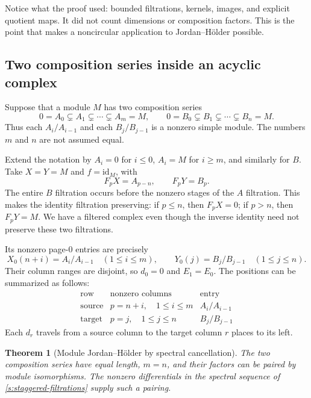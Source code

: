 \documentclass[11pt]{article}
\newtheorem{theorem}{Theorem}[section]
\theoremstyle{definition}
\theoremstyle{remark}\newtheorem{remark}[theorem]{Remark}
\newcommand{\id}{\mathrm{id}}
\begin{document}
Notice what the proof used: bounded filtrations, kernels, images, and
explicit quotient maps. It did not count dimensions or composition
factors. This is the point that makes a noncircular application to
Jordan--H\"older possible.

\subsection{Two composition series inside an acyclic complex}

Suppose that a module $M$ has two composition series
\[
0=A_0\subsetneq A_1\subsetneq\cdots\subsetneq A_m=M,
\qquad
0=B_0\subsetneq B_1\subsetneq\cdots\subsetneq B_n=M.
\]
Thus each $A_i/A_{i-1}$ and each $B_j/B_{j-1}$ is a nonzero simple
module. The numbers $m$ and $n$ are not assumed equal.

Extend the notation by $A_i=0$ for $i\leq0$, $A_i=M$ for $i\geq m$,
and similarly for $B$. Take $X=Y=M$ and $f=\id_M$, with
\begin{equation}\label{s:staggered-filtrations}
F_pX=A_{p-n},\qquad F_pY=B_p.
\end{equation}
The entire $B$ filtration occurs before the nonzero stages of the
$A$ filtration. This makes the identity filtration preserving:
if $p\leq n$, then $F_pX=0$; if $p>n$, then $F_pY=M$.
We have a filtered complex even though the inverse identity need not
preserve these two filtrations.

Its nonzero page-$0$ entries are precisely
\[
X_0(n+i)=A_i/A_{i-1}\quad(1\leq i\leq m),
\qquad
Y_0(j)=B_j/B_{j-1}\quad(1\leq j\leq n).
\]
Their column ranges are disjoint, so $d_0=0$ and $E_1=E_0$.
The positions can be summarized as follows:
\[
\begin{array}{c|c|c}
\text{row}&\text{nonzero columns}&\text{entry}\\ \hline
\text{source}&p=n+i,\quad1\leq i\leq m&A_i/A_{i-1}\\
\text{target}&p=j,\quad1\leq j\leq n&B_j/B_{j-1}
\end{array}
\]
Each $d_r$ travels from a source column to the target column $r$ places
to its left.

\begin{theorem}[Module Jordan--H\"older by spectral cancellation]
\label{s:jordan-holder}
The two composition series have equal length, $m=n$, and their factors
can be paired by module isomorphisms. The nonzero differentials in the
spectral sequence of \eqref{s:staggered-filtrations} supply such a pairing.
\end{theorem}
\end{document}
